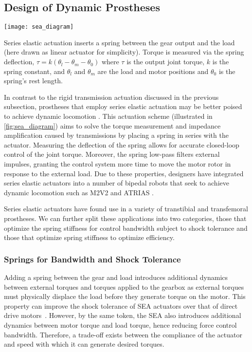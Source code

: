 

\subsection{Design of Dynamic Prostheses}\label{sec:back_dyn_pros}
\begin{marginfigure}[0in]
    \centering
    \texttt{[image: sea\_diagram]}
    \caption{Series elastic actuation inserts a spring between the gear output
    and the load (here drawn as linear actuator for simplicity). Torque is
    measured via the spring deflection, $\tau = k(\theta_l - \theta_m -
    \theta_0)$ where $\tau$ is the output joint torque, $k$ is the spring
    constant, and $\theta_l$ and $\theta_m$ are the load and motor positions and
    $\theta_0$ is the spring's rest length.}
    \label{fig:sea_diagram}
\end{marginfigure}
In contrast to the rigid transmission actuation discussed in the previous
subsection, prostheses that employ series elastic actuation may be better poised
to achieve dynamic locomotion \citep{pratt1995series}. This actuation scheme
(illustrated in \cref{fig:sea_diagram}) aims to solve the torque measurement and
impedance amplification caused by transmissions by placing a spring in series
with the actuator. Measuring the deflection of the spring allows for accurate
closed-loop control of the joint torque. Moreover, the spring low-pass filters
external impulses, granting the control system more time to move the motor rotor
in response to the external load.  Due to these properties, designers have
integrated series elastic actuators into a number of bipedal robots that seek to
achieve dynamic locomotion such as M2V2 \citep{pratt2008design} and ATRIAS
\citep{grimes2013atrias}.

Series elastic actuators have found use in a variety of transtibial and
transfemoral prostheses. We can further split these applications into two
categories, those that optimize the spring stiffness for control bandwidth
subject to shock tolerance and those that optimize spring stiffness to optimize
efficiency.

\subsubsection{Springs for Bandwidth and Shock Tolerance}
Adding a spring between the gear and load introduces additional dynamics between
external torques and torques applied to the gearbox as external torques must
physically displace the load before they generate torque on the motor. This
property can improve the shock tolerance of SEA actuators over that of direct
drive motors~\citep{robinson2000design}. However, by the same token, the SEA
also introduces additional dynamics between motor torque and load torque, hence
reducing force control bandwidth. Therefore, a trade-off exists between the
compliance of the actuator and speed with which it can generate desired torques.

